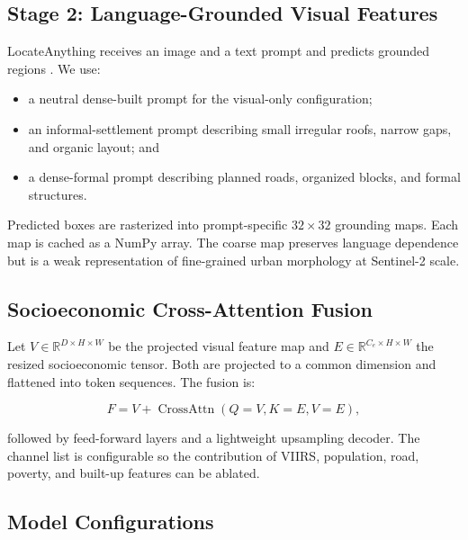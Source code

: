 \documentclass[11pt,a4paper]{article}
\begin{document}
\subsection{Stage 2: Language-Grounded Visual Features}

LocateAnything receives an image and a text prompt and predicts grounded regions \citep{wang2026locateanything}. We use:

\begin{itemize}
    \item a neutral dense-built prompt for the visual-only configuration;
    \item an informal-settlement prompt describing small irregular roofs, narrow gaps, and organic layout; and
    \item a dense-formal prompt describing planned roads, organized blocks, and formal structures.
\end{itemize}

Predicted boxes are rasterized into prompt-specific \(32\times32\) grounding maps. Each map is cached as a NumPy array. The coarse map preserves language dependence but is a weak representation of fine-grained urban morphology at Sentinel-2 scale.

\subsection{Socioeconomic Cross-Attention Fusion}

Let \(V\in\mathbb{R}^{D\times H\times W}\) be the projected visual feature map and \(E\in\mathbb{R}^{C_e\times H\times W}\) the resized socioeconomic tensor. Both are projected to a common dimension and flattened into token sequences. The fusion is:

\begin{equation}
F = V + \operatorname{CrossAttn}(Q=V,K=E,V=E),
\end{equation}

followed by feed-forward layers and a lightweight upsampling decoder. The channel list is configurable so the contribution of VIIRS, population, road, poverty, and built-up features can be ablated.

\subsection{Model Configurations}
\end{document}
